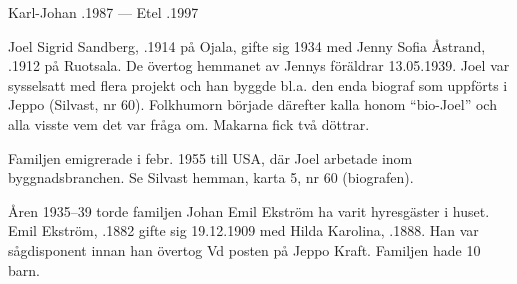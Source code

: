 Karl-Johan .1987  ---  Etel .1997


Joel Sigrid Sandberg, .1914 på Ojala, gifte sig 1934 med Jenny Sofia Åstrand, .1912 på Ruotsala. De övertog hemmanet av Jennys föräldrar 13.05.1939. Joel var sysselsatt med flera projekt och han byggde bl.a. den enda biograf som uppförts i Jeppo (Silvast, nr 60). Folkhumorn började därefter kalla honom ``bio-Joel'' och alla visste vem det var fråga om. Makarna fick två döttrar.
\begin{jhchildren}
  \item {}
  \item {}
\end{jhchildren}

Familjen emigrerade i febr. 1955 till USA, där Joel arbetade inom byggnadsbranchen. Se Silvast hemman, karta 5, nr 60 (biografen).

Åren 1935--39 torde familjen Johan Emil Ekström ha varit hyresgäster i huset. Emil Ekström, .1882 gifte sig 19.12.1909 med Hilda Karolina, .1888. Han var sågdisponent innan han övertog Vd posten på Jeppo Kraft. Familjen hade 10 barn.
\begin{jhchildren}
  \item {}
  \item {}
  \item {}
  \item {}
  \item {}
  \item {}
  \item {}
  \item {}
  \item {}
  \item {}
\end{jhchildren}


